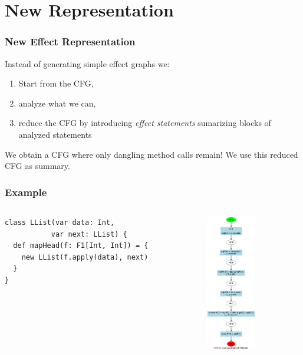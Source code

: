\documentclass[hyperref={pdfpagelabels=false}]{beamer}
\begin{document}
\section{New Representation}
\begin{frame}[fragile]
\frametitle{New Effect Representation}
    Instead of generating simple effect graphs we:
    \begin{enumerate}
        \item Start from the CFG,
        \item analyze what we can,
        \item reduce the CFG by introducing \emph{effect statements} sumarizing
        blocks of analyzed statements
    \end{enumerate}

    \vspace{15pt}

    We obtain a CFG where only dangling method calls remain! We use this
    reduced CFG as summary.

\end{frame}

\begin{frame}[fragile]
\frametitle{Example}
  \begin{columns}
    \begin{column}{0.4\textwidth}
\begin{lstlisting}[escapechar=\%]
class LList(var data: Int,
           var next: LList) {
  def mapHead(f: F1[Int, Int]) = {
    new LList(f.apply(data), next)
  }
}
\end{lstlisting}
    \end{column}
    \begin{column}{0.6\textwidth}
      \begin{figure}[t]
        \includegraphics[height=60mm]{images/e3.png}\\
      \end{figure}
    \end{column}
  \end{columns}
\end{frame}
\end{document}
